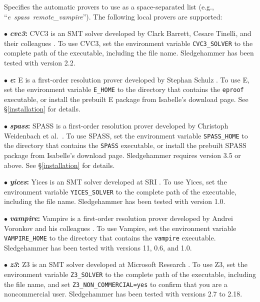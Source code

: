 \documentclass[a4paper,12pt]{article}
\begin{document}
\begin{enum}
Specifies the automatic provers to use as a space-separated list (e.g.,
``\textit{e}~\textit{spass}~\textit{remote\_vampire}''). The following local
provers are supported:

\begin{enum}
\item[$\bullet$] \textbf{\textit{cvc3}:} CVC3 is an SMT solver developed by
Clark Barrett, Cesare Tinelli, and their colleagues \cite{cvc3}. To use CVC3,
set the environment variable \texttt{CVC3\_SOLVER} to the complete path of the
executable, including the file name. Sledgehammer has been tested with version
2.2.

\item[$\bullet$] \textbf{\textit{e}:} E is a first-order resolution prover
developed by Stephan Schulz \cite{schulz-2002}. To use E, set the environment
variable \texttt{E\_HOME} to the directory that contains the \texttt{eproof}
executable, or install the prebuilt E package from Isabelle's download page. See
\S\ref{installation} for details.

\item[$\bullet$] \textbf{\textit{spass}:} SPASS is a first-order resolution
prover developed by Christoph Weidenbach et al.\ \cite{weidenbach-et-al-2009}.
To use SPASS, set the environment variable \texttt{SPASS\_HOME} to the directory
that contains the \texttt{SPASS} executable, or install the prebuilt SPASS
package from Isabelle's download page. Sledgehammer requires version 3.5 or
above. See \S\ref{installation} for details.

\item[$\bullet$] \textbf{\textit{yices}:} Yices is an SMT solver developed at
SRI \cite{yices}. To use Yices, set the environment variable
\texttt{YICES\_SOLVER} to the complete path of the executable, including the
file name. Sledgehammer has been tested with version 1.0.

\item[$\bullet$] \textbf{\textit{vampire}:} Vampire is a first-order resolution
prover developed by Andrei Voronkov and his colleagues
\cite{riazanov-voronkov-2002}. To use Vampire, set the environment variable
\texttt{VAMPIRE\_HOME} to the directory that contains the \texttt{vampire}
executable. Sledgehammer has been tested with versions 11, 0.6, and 1.0.

\item[$\bullet$] \textbf{\textit{z3}:} Z3 is an SMT solver developed at
Microsoft Research \cite{z3}. To use Z3, set the environment variable
\texttt{Z3\_SOLVER} to the complete path of the executable, including the file
name, and set \texttt{Z3\_NON\_COMMERCIAL=yes} to confirm that you are a
noncommercial user. Sledgehammer has been tested with versions 2.7 to 2.18.


\end{enum}
\end{enum}
\end{document}
